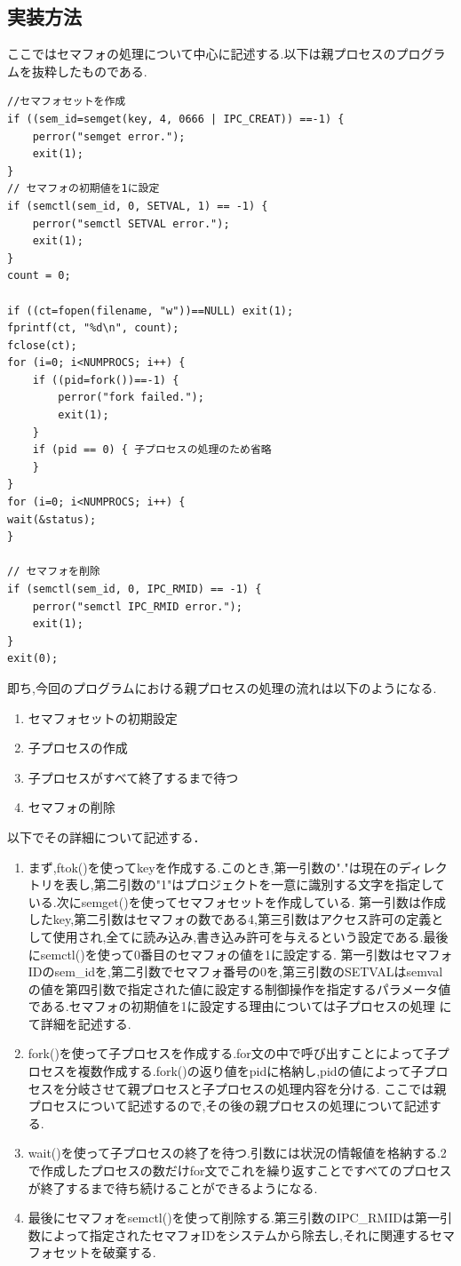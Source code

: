 \documentclass[dvipdfmx]{jarticle}
\begin{document}
\subsection{実装方法}
ここではセマフォの処理について中心に記述する.以下は親プロセスのプログラムを抜粋したものである.
\begin{lstlisting}
//セマフォセットを作成
if ((sem_id=semget(key, 4, 0666 | IPC_CREAT)) ==-1) {
    perror("semget error.");
    exit(1);
}
// セマフォの初期値を1に設定
if (semctl(sem_id, 0, SETVAL, 1) == -1) {
    perror("semctl SETVAL error.");
    exit(1);
}
count = 0;

if ((ct=fopen(filename, "w"))==NULL) exit(1);
fprintf(ct, "%d\n", count);
fclose(ct);
for (i=0; i<NUMPROCS; i++) {
    if ((pid=fork())==-1) {
        perror("fork failed.");
        exit(1);
    }
    if (pid == 0) { 子プロセスの処理のため省略
    }
}
for (i=0; i<NUMPROCS; i++) {
wait(&status);
}

// セマフォを削除
if (semctl(sem_id, 0, IPC_RMID) == -1) {
    perror("semctl IPC_RMID error.");
    exit(1);
}
exit(0);
\end{lstlisting}
即ち,今回のプログラムにおける親プロセスの処理の流れは以下のようになる.
\begin{enumerate}
    \item セマフォセットの初期設定
    \item 子プロセスの作成
    \item 子プロセスがすべて終了するまで待つ
    \item セマフォの削除
\end{enumerate}
以下でその詳細について記述する．
\begin{enumerate}
    \item まず,ftok()を使ってkeyを作成する.このとき,第一引数の"."は現在のディレクトリを表し,第二引数の"1"はプロジェクトを一意に識別する文字を指定している.\cite{1}次にsemget()を使ってセマフォセットを作成している.
    第一引数は作成したkey,第二引数はセマフォの数である4,第三引数はアクセス許可の定義として使用され,全てに読み込み,書き込み許可を与えるという設定である.\cite{2}最後にsemctl()を使って0番目のセマフォの値を1に設定する.
    第一引数はセマフォIDのsem\_idを,第二引数でセマフォ番号の0を,第三引数のSETVALはsemvalの値を第四引数で指定された値に設定する制御操作を指定するパラメータ値である.セマフォの初期値を1に設定する理由については子プロセスの処理
    にて詳細を記述する.
    \item fork()を使って子プロセスを作成する.for文の中で呼び出すことによって子プロセスを複数作成する.fork()の返り値をpidに格納し,pidの値によって子プロセスを分岐させて親プロセスと子プロセスの処理内容を分ける.
    ここでは親プロセスについて記述するので,その後の親プロセスの処理について記述する.
    \item wait()を使って子プロセスの終了を待つ.引数には状況の情報値を格納する.2で作成したプロセスの数だけfor文でこれを繰り返すことですべてのプロセスが終了するまで待ち続けることができるようになる.\cite{3}
    \item 最後にセマフォをsemctl()を使って削除する.第三引数のIPC\_RMIDは第一引数によって指定されたセマフォIDをシステムから除去し,それに関連するセマフォセットを破棄する.\cite{2}
\end{enumerate}
\end{document}

